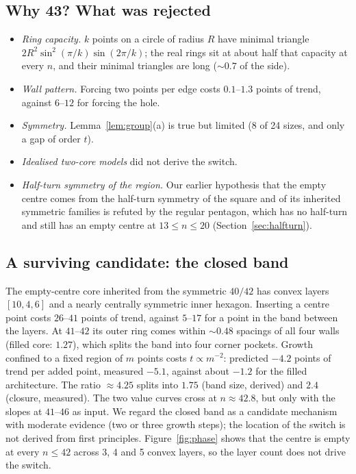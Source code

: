 \documentclass[11pt]{amsart}
\theoremstyle{definition}
\begin{document}
\subsection{Why 43? What was rejected}
\begin{itemize}
\item \emph{Ring capacity.} $k$ points on a circle of radius $R$ have minimal triangle $2R^2\sin^2(\pi/k)\sin(2\pi/k)$; the real rings sit at about half that capacity at every $n$, and their minimal triangles are long ($\sim0.7$ of the side). %
\item \emph{Wall pattern.} Forcing two points per edge costs $0.1$--$1.3$ points of trend, against $6$--$12$ for forcing the hole. %
\item \emph{Symmetry.} Lemma~\ref{lem:group}(a) is true but limited (8 of 24 sizes, and only a gap of order $t$).
\item \emph{Idealised two-core models} did not derive the switch. %
\item \emph{Half-turn symmetry of the region.} Our earlier hypothesis that the empty centre comes from the half-turn symmetry of the square and of its inherited symmetric families is refuted by the regular pentagon, which has no half-turn and still has an empty centre at $13 \le n \le 20$ (Section~\ref{sec:halfturn}). %
\end{itemize}

\subsection{A surviving candidate: the closed band}
The empty-centre core inherited from the symmetric $40/42$ has convex layers $[10,4,6]$ and a nearly centrally symmetric inner hexagon. Inserting a centre point costs $26$--$41$ points of trend, against $5$--$17$ for a point in the band between the layers. At $41$--$42$ its outer ring comes within $\sim0.48$ spacings of all four walls (filled core: $1.27$), which splits the band into four corner pockets. Growth confined to a fixed region of $m$ points costs $t \propto m^{-2}$: predicted $-4.2$ points of trend per added point, measured $-5.1$, against about $-1.2$ for the filled architecture. The ratio $\approx 4.25$ splits into $1.75$ (band size, derived) and $2.4$ (closure, measured). The two value curves cross at $n \approx 42.8$, but only with the slopes at $41$--$46$ as input. We regard the closed band as a candidate mechanism with moderate evidence (two or three growth steps); the location of the switch is not derived from first principles. %
Figure~\ref{fig:phase} shows that the centre is empty at every $n \le 42$ across 3, 4 and 5 convex layers, so the layer count does not drive the switch. %
\end{document}
